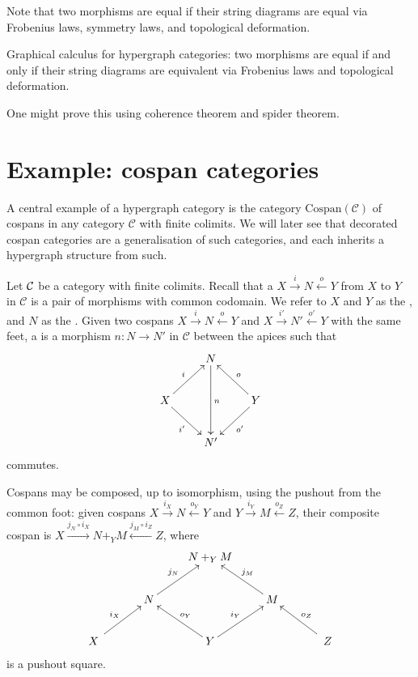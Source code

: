 Note that two morphisms are equal if their string diagrams are equal via
Frobenius laws, symmetry laws, and topological deformation.

\begin{conjecture}
  Graphical calculus for hypergraph categories: two morphisms are equal if and
  only if their string diagrams are equivalent via Frobenius laws and
  topological deformation.
\end{conjecture}

One might prove this using coherence theorem and spider theorem.


\section{Example: cospan categories}

  A central example of a hypergraph category is the category
  $\mathrm{Cospan(\mathcal C)}$ of cospans in any category $\mathcal C$ with
  finite colimits. We will later see that decorated cospan categories are a
  generalisation of such categories, and each inherits a hypergraph structure
  from such. 

  Let $\mathcal C$ be a category with finite colimits.
Recall that a  $X \stackrel{i}{\longrightarrow} N
\stackrel{o}{\longleftarrow} Y$  from $X$ to $Y$ in $\mathcal C$ is a pair of
morphisms with common codomain. We refer to $X$ and $Y$ as the ,
and $N$ as the .  Given two cospans $X
\stackrel{i}{\longrightarrow} N \stackrel{o}{\longleftarrow} Y$ and $X
\stackrel{i'}{\longrightarrow} N' \stackrel{o'}{\longleftarrow} Y$ with the same
feet, a  is a morphism $n\colon  N \to N'$ in $\mathcal
C$ between the apices such that
\[
  \xymatrix{
    & N \ar[dd]^n  \\
    X \ar[ur]^{i} \ar[dr]_{i'} && Y \ar[ul]_{o} \ar[dl]^{o'}\\
    & N'
  }
\]
commutes.

Cospans may be composed, up to isomorphism, using the pushout from the common
foot: given cospans $X \stackrel{i_X}{\longrightarrow} N
\stackrel{o_Y}{\longleftarrow} Y$ and $Y \stackrel{i_Y}{\longrightarrow} M
\stackrel{o_Z}{\longleftarrow} Z$, their composite cospan is $X \stackrel{j_N
  \circ i_X}{\longrightarrow} N+_YM \stackrel{j_M\circ i_Z}{\longleftarrow} Z$,
  where 
\[
  \xymatrix{
    && N+_YM \\
    & N \ar[ur]^{j_N} && M \ar[ul]_{j_M} \\
    \quad X \quad \ar[ur]^{i_X} && Y \ar[ul]_{o_Y} \ar[ur]^{i_Y} && \quad Z \quad \ar[ul]_{o_Z}
  }
\]
is a pushout square. 

